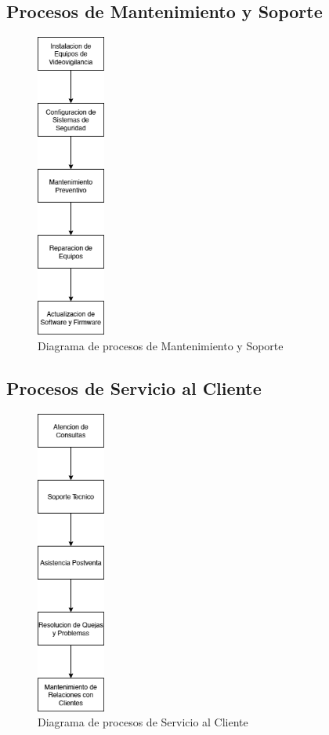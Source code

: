 \documentclass{report}
\begin{document}
        \clearpage\subsection*{Procesos de Mantenimiento y Soporte}
          \begin{figure}[H]
            \centering
            \includegraphics[width=0.2\textwidth]{./img/pro_int_mant.png}
            \caption{Diagrama de procesos de Mantenimiento y Soporte}
          \end{figure}
        \clearpage\subsection*{Procesos de Servicio al Cliente}
          \begin{figure}[H]
            \centering
            \includegraphics[width=0.2\textwidth]{./img/pro_ser_cli.png}
            \caption{Diagrama de procesos de Servicio al Cliente}
          \end{figure}
\end{document}
